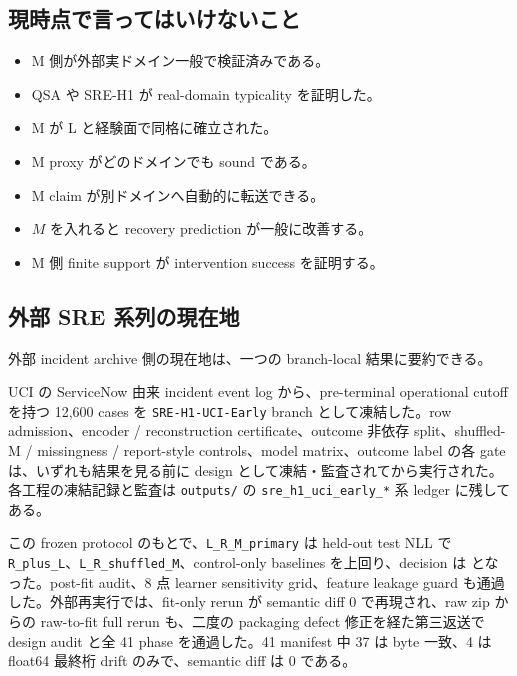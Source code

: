 \documentclass[12pt,a4paper]{article}
\begin{document}
\subsection{現時点で言ってはいけないこと}\label{ux73feux6642ux70b9ux3067ux8a00ux3063ux3066ux306fux3044ux3051ux306aux3044ux3053ux3068}

\begin{itemize}
\tightlist
\item
  M 側が外部実ドメイン一般で検証済みである。
\item
  QSA や SRE-H1 が real-domain typicality を証明した。
\item
  M が L と経験面で同格に確立された。
\item
  M proxy がどのドメインでも sound である。
\item
  M claim が別ドメインへ自動的に転送できる。
\item
  \(M\) を入れると recovery prediction が一般に改善する。
\item
  M 側 finite support が intervention success を証明する。
\end{itemize}

\subsection{外部 SRE 系列の現在地}\label{ux5916ux90e8-sre-ux7cfbux5217ux306eux73feux5728ux5730}

外部 incident archive 側の現在地は、一つの branch-local 結果に要約できる。

UCI の ServiceNow 由来 incident event log から、pre-terminal operational cutoff を持つ 12,600 cases を \texttt{SRE-H1-UCI-Early} branch として凍結した。row admission、encoder / reconstruction certificate、outcome 非依存 split、shuffled-M / missingness / report-style controls、model matrix、outcome label の各 gate は、いずれも結果を見る前に design として凍結・監査されてから実行された。各工程の凍結記録と監査は \texttt{outputs/} の \texttt{sre\_h1\_uci\_early\_*} 系 ledger に残してある。

この frozen protocol のもとで、\texttt{L\_R\_M\_primary} は held-out test NLL で \texttt{R\_plus\_L}、\texttt{L\_R\_shuffled\_M}、control-only baselines を上回り、decision は {\scriptsize{}} となった。post-fit audit、8 点 learner sensitivity grid、feature leakage guard も通過した。外部再実行では、fit-only rerun が semantic diff 0 で再現され、raw zip からの raw-to-fit full rerun も、二度の packaging defect 修正を経た第三返送で design audit と全 41 phase を通過した。41 manifest 中 37 は byte 一致、4 は float64 最終桁 drift のみで、semantic diff は 0 である。
\end{document}
